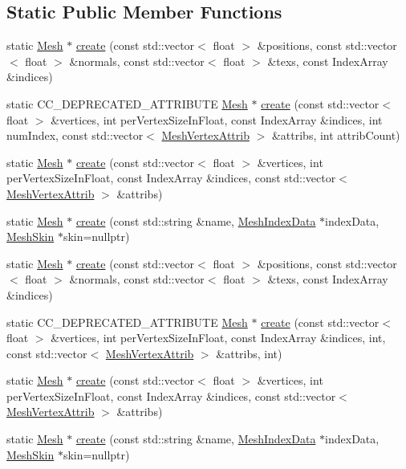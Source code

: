 \subsection*{Static Public Member Functions}
\begin{DoxyCompactItemize}
\item 
static \hyperlink{classMesh}{Mesh} $\ast$ \hyperlink{classMesh_af6f521945ac85456827b7152f594d418}{create} (const std\+::vector$<$ float $>$ \&positions, const std\+::vector$<$ float $>$ \&normals, const std\+::vector$<$ float $>$ \&texs, const Index\+Array \&indices)
\item 
static C\+C\+\_\+\+D\+E\+P\+R\+E\+C\+A\+T\+E\+D\+\_\+\+A\+T\+T\+R\+I\+B\+U\+TE \hyperlink{classMesh}{Mesh} $\ast$ \hyperlink{classMesh_ae8d51994d357534680ed36bfe0d6346a}{create} (const std\+::vector$<$ float $>$ \&vertices, int per\+Vertex\+Size\+In\+Float, const Index\+Array \&indices, int num\+Index, const std\+::vector$<$ \hyperlink{structMeshVertexAttrib}{Mesh\+Vertex\+Attrib} $>$ \&attribs, int attrib\+Count)
\item 
static \hyperlink{classMesh}{Mesh} $\ast$ \hyperlink{classMesh_a3f5fa215cad0007671d2fc8fd799f009}{create} (const std\+::vector$<$ float $>$ \&vertices, int per\+Vertex\+Size\+In\+Float, const Index\+Array \&indices, const std\+::vector$<$ \hyperlink{structMeshVertexAttrib}{Mesh\+Vertex\+Attrib} $>$ \&attribs)
\item 
static \hyperlink{classMesh}{Mesh} $\ast$ \hyperlink{classMesh_a182577b1a4f6d49f36cd489e30448d3f}{create} (const std\+::string \&name, \hyperlink{classMeshIndexData}{Mesh\+Index\+Data} $\ast$index\+Data, \hyperlink{classMeshSkin}{Mesh\+Skin} $\ast$skin=nullptr)
\item 
static \hyperlink{classMesh}{Mesh} $\ast$ \hyperlink{classMesh_a202e7feff9cebe878ad1c157a8f644d0}{create} (const std\+::vector$<$ float $>$ \&positions, const std\+::vector$<$ float $>$ \&normals, const std\+::vector$<$ float $>$ \&texs, const Index\+Array \&indices)
\item 
static C\+C\+\_\+\+D\+E\+P\+R\+E\+C\+A\+T\+E\+D\+\_\+\+A\+T\+T\+R\+I\+B\+U\+TE \hyperlink{classMesh}{Mesh} $\ast$ \hyperlink{classMesh_ab2b8bb244d820e123a75a21d43fc4e6d}{create} (const std\+::vector$<$ float $>$ \&vertices, int per\+Vertex\+Size\+In\+Float, const Index\+Array \&indices, int, const std\+::vector$<$ \hyperlink{structMeshVertexAttrib}{Mesh\+Vertex\+Attrib} $>$ \&attribs, int)
\item 
static \hyperlink{classMesh}{Mesh} $\ast$ \hyperlink{classMesh_a4563d7c3ec3ddc78e06c552169749975}{create} (const std\+::vector$<$ float $>$ \&vertices, int per\+Vertex\+Size\+In\+Float, const Index\+Array \&indices, const std\+::vector$<$ \hyperlink{structMeshVertexAttrib}{Mesh\+Vertex\+Attrib} $>$ \&attribs)
\item 
static \hyperlink{classMesh}{Mesh} $\ast$ \hyperlink{classMesh_ae362fa6755a83ff158b7f84924cb4e9e}{create} (const std\+::string \&name, \hyperlink{classMeshIndexData}{Mesh\+Index\+Data} $\ast$index\+Data, \hyperlink{classMeshSkin}{Mesh\+Skin} $\ast$skin=nullptr)
\end{DoxyCompactItemize}
